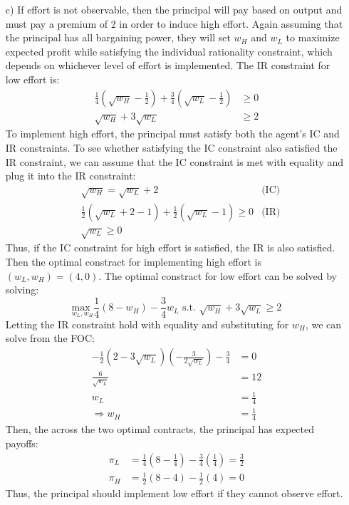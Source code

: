 \documentclass{article}
\newcommand{\usmax}[1]{\underset{#1}{\text{max }}}
\begin{document}
\begin{itemize}
	\item[c)] If effort is not observable, then the principal will pay based on output and must pay a premium of 2 in order to induce high effort. Again assuming that the principal has all bargaining power, they will set $w_H$ and $w_L$ to maximize expected profit while satisfying the individual rationality constraint, which depends on whichever level of effort is implemented. The IR constraint for low effort is:
		\begin{align*}
			\frac{1}{4}\left(\sqrt{w_H} - \frac{1}{2}\right) + \frac{3}{4}\left(\sqrt{w_L} - \frac{1}{2}\right) &\geq 0	\\
																					\sqrt{w_H} + 3\sqrt{w_L}	&\geq 2
		\end{align*}
		To implement high effort, the principal must satisfy both the agent's IC and IR constraints. To see whether satisfying the IC constraint also satisfied the IR constraint, we can assume that the IC constraint is met with equality and plug it into the IR constraint:
		\begin{align*}
			&\sqrt{w_H}	= \sqrt{w_L} + 2															&\text{(IC)}	\\
			&\frac{1}{2}\left(\sqrt{w_L}+2-1\right) + \frac{1}{2}\left(\sqrt{w_L}-1\right)	\geq 0	&\text{(IR)}	\\
			&\sqrt{w_L}	\geq 0
		\end{align*}
		Thus, if the IC constraint for high effort is satisfied, the IR is also satisfied. Then the optimal constract for implementing high effort is ${(w_L,w_H)=(4,0)}$. The optimal constract for low effort can be solved by solving:
		\[
			\usmax{w_L,w_H}\frac{1}{4}\left(8-w_H\right) - \frac{3}{4}w_L\text{ s.t. } \sqrt{w_H} + 3\sqrt{w_L}\geq 2
		\]
		Letting the IR constraint hold with equality and substituting for $w_H$, we can solve from the FOC:
		\begin{align*}
			-\frac{1}{2}\left(2-3\sqrt{w_L}\right)\left(-\frac{3}{2\sqrt{w_L}}\right) - \frac{3}{4}	&= 0			\\
																			\frac{6}{\sqrt{w_L}}	&= 12			\\
																								w_L	&= \frac{1}{4}	\\
																					\Rightarrow	w_H	&= \frac{1}{4}
		\end{align*}
		Then, the across the two optimal contracts, the principal has expected payoffs:
		\begin{align*}
			\pi_L &= \frac{1}{4}\left(8-\frac{1}{4}\right) - \frac{3}{4}\left(\frac{1}{4}\right) = \frac{3}{2}	\\
			\pi_H &= \frac{1}{2}\left(8-4\right) - \frac{1}{2}\left(4\right) = 0
		\end{align*}
		Thus, the principal should implement low effort if they cannot observe effort.
		
\end{itemize}
\end{document}
